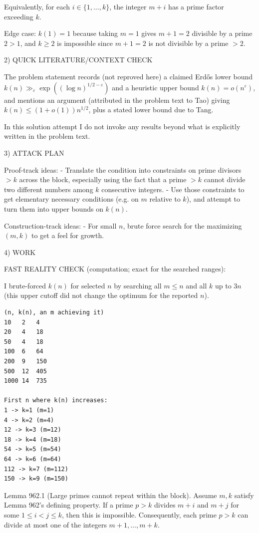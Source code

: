 Equivalently, for each $i\in\{1,\dots,k\}$, the integer $m+i$ has a prime factor exceeding $k$.

Edge case: $k(1)=1$ because taking $m=1$ gives $m+1=2$ divisible by a prime $2>1$, and $k\ge 2$ is impossible since $m+1=2$ is not divisible by a prime $>2$.

2) QUICK LITERATURE/CONTEXT CHECK

The problem statement records (not reproved here) a claimed Erd\H{o}s lower bound $k(n)\gg_\varepsilon \exp((\log n)^{1/2-\varepsilon})$ and a heuristic upper bound $k(n)=o(n^\varepsilon)$, and mentions an argument (attributed in the problem text to Tao) giving $k(n)\le (1+o(1))n^{1/2}$, plus a stated lower bound due to Tang.

In this solution attempt I do not invoke any results beyond what is explicitly written in the problem text.

3) ATTACK PLAN

Proof-track ideas:
- Translate the condition into constraints on prime divisors $>k$ across the block, especially using the fact that a prime $>k$ cannot divide two different numbers among $k$ consecutive integers.
- Use those constraints to get elementary necessary conditions (e.g. on $m$ relative to $k$), and attempt to turn them into upper bounds on $k(n)$.

Construction-track ideas:
- For small $n$, brute force search for the maximizing $(m,k)$ to get a feel for growth.

4) WORK

FAST REALITY CHECK (computation; exact for the searched ranges):

I brute-forced $k(n)$ for selected $n$ by searching all $m\le n$ and all $k$ up to $3n$ (this upper cutoff did not change the optimum for the reported $n$).

\begin{verbatim}
(n, k(n), an m achieving it)
10   2   4
20   4   18
50   4   18
100  6   64
200  9   150
500  12  405
1000 14  735

First n where k(n) increases:
1 -> k=1 (m=1)
4 -> k=2 (m=4)
12 -> k=3 (m=12)
18 -> k=4 (m=18)
54 -> k=5 (m=54)
64 -> k=6 (m=64)
112 -> k=7 (m=112)
150 -> k=9 (m=150)
\end{verbatim}

Lemma 962.1 (Large primes cannot repeat within the block).
Assume $m,k$ satisfy Lemma 962's defining property. If a prime $p>k$ divides $m+i$ and $m+j$ for some $1\le i<j\le k$, then this is impossible. Consequently, each prime $p>k$ can divide at most one of the integers $m+1,\dots,m+k$.

